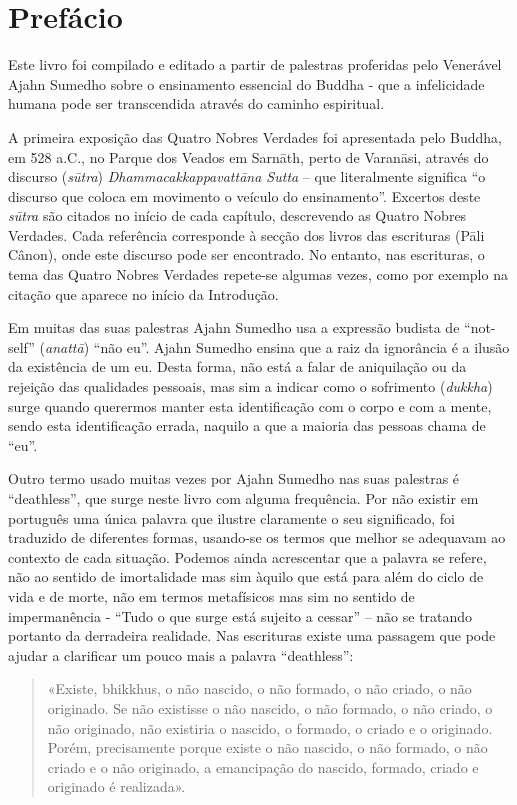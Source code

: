 \chapter{Prefácio}

Este livro foi compilado e editado a partir de palestras proferidas pelo
Venerável Ajahn Sumedho sobre o ensinamento essencial do Buddha - que a
infelicidade humana pode ser transcendida através do caminho espiritual.

A primeira exposição das Quatro Nobres Verdades foi apresentada pelo Buddha, em
528 a.C., no Parque dos Veados em Sarnāth, perto de Varanāsi, através do
discurso (\emph{sūtra}) \emph{Dhammacakkappavattāna Sutta} – que literalmente
significa “o discurso que coloca em movimento o veículo do ensinamento”.
Excertos deste \emph{sūtra} são citados no início de cada capítulo, descrevendo
as Quatro Nobres Verdades. Cada referência corresponde à secção dos livros das
escrituras (Pāli Cânon), onde este discurso pode ser encontrado. No entanto, nas
escrituras, o tema das Quatro Nobres Verdades repete-se algumas vezes, como por
exemplo na citação que aparece no início da Introdução.

Em muitas das suas palestras Ajahn Sumedho usa a expressão budista de “not-self”
(\emph{anattā}) “não eu”. Ajahn Sumedho ensina que a raiz da ignorância é a
ilusão da existência de um eu. Desta forma, não está a falar de aniquilação ou
da rejeição das qualidades pessoais, mas sim a indicar como o sofrimento
(\emph{dukkha}) surge quando querermos manter esta identificação com o corpo e
com a mente, sendo esta identificação errada, naquilo a que a maioria das
pessoas chama de “eu”.

Outro termo usado muitas vezes por Ajahn Sumedho nas suas palestras é
“deathless”, que surge neste livro com alguma frequência. Por não existir em
português uma única palavra que ilustre claramente o seu significado, foi
traduzido de diferentes formas, usando-se os termos que melhor se adequavam ao
contexto de cada situação. Podemos ainda acrescentar que a palavra se refere,
não ao sentido de imortalidade mas sim àquilo que está para além do ciclo de
vida e de morte, não em termos metafísicos mas sim no sentido de impermanência -
“Tudo o que surge está sujeito a cessar” – não se tratando portanto da
derradeira realidade. Nas escrituras existe uma passagem que pode ajudar a
clarificar um pouco mais a palavra “deathless”:

\begin{quote}
  «Existe, bhikkhus, o não nascido, o não formado, o não criado, o não
  originado. Se não existisse o não nascido, o não formado, o não criado, o não
  originado, não existiria o nascido, o formado, o criado e o originado. Porém,
  precisamente porque existe o não nascido, o não formado, o não criado e o não
  originado, a emancipação do nascido, formado, criado e originado é realizada».

\end{quote}

